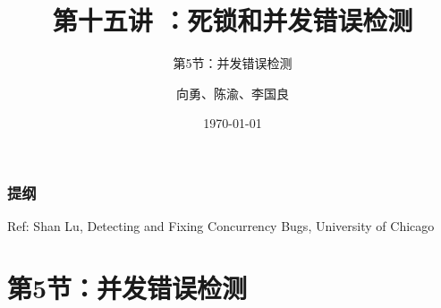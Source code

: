 


\title[第15讲]{第十五讲 ：死锁和并发错误检测} %
\subtitle{第5节：并发错误检测}
\author{向勇、陈渝、李国良} %
\date{\today} %



\begin{frame}
\titlepage %
\end{frame}

\begin{frame}
\frametitle{提纲} %
\tableofcontents %

Ref: Shan Lu, Detecting and Fixing Concurrency Bugs, University of Chicago

\end{frame}
\section{第5节：并发错误检测} %
